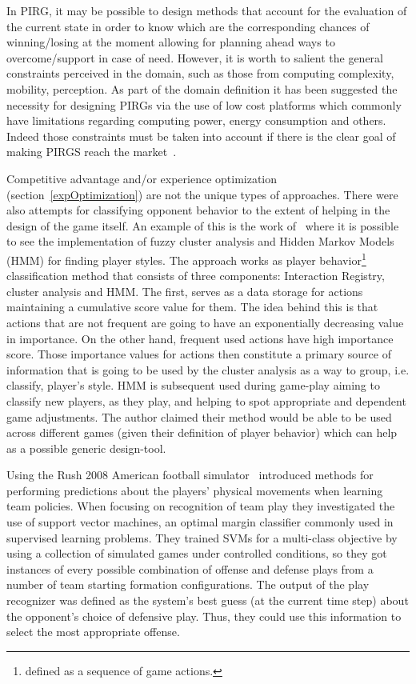In PIRG, it may be possible to design methods that account for the evaluation of the current state in order to know which are the corresponding chances of winning/losing at the moment allowing for planning ahead ways to overcome/support in case of need. However, it is worth to salient the general constraints perceived in the domain, such as those from computing complexity, mobility, perception. As part of the domain definition it has been suggested the necessity for designing PIRGs via the use of low cost platforms which commonly have limitations regarding computing power, energy consumption and others. Indeed those constraints must be taken into account if there is the clear goal of making PIRGS reach the market~\cite{martinoia2013physically}.

Competitive advantage and/or experience optimization (section~\ref{expOptimization}) are not the unique types of approaches. There were also attempts for classifying opponent behavior to the extent of helping in the design of the game itself. An example of this is the work of~\cite{etheredge2013generic} where it is possible to see the implementation of fuzzy cluster analysis and Hidden Markov Models (HMM) for finding player styles. The approach works as  player behavior\footnote{defined as a sequence of game actions.} classification method that consists of three components: Interaction Registry, cluster analysis and HMM. The first, serves as a data storage for actions maintaining a cumulative score value for them. The idea behind this is that actions that are not frequent are going to have an exponentially decreasing value in importance. On the other hand, frequent used actions have high importance score. Those importance values for actions then constitute a primary source of information that is going to be used by the cluster analysis as a way to group, i.e. classify, player's style. HMM is subsequent used during game-play aiming to classify new players, as they play, and helping to spot appropriate and dependent game adjustments. The author claimed their method would be able to be used across different games (given their definition of player behavior) which can help as a possible generic design-tool.

Using the Rush 2008 American football simulator~\cite{laviersa2014using} introduced methods for performing predictions about the players' physical movements when learning team policies. When focusing on recognition of team play they investigated the use of support vector machines, an optimal margin classifier commonly used in supervised learning problems. They trained SVMs for a multi-class objective by using a collection of simulated games under controlled conditions, so they got instances of every possible combination of offense and defense plays from a number of team starting formation configurations. The output of the play recognizer was defined as the system's best guess (at the current time step) about the opponent's choice of defensive play. Thus, they could use this information to select the most appropriate offense.

